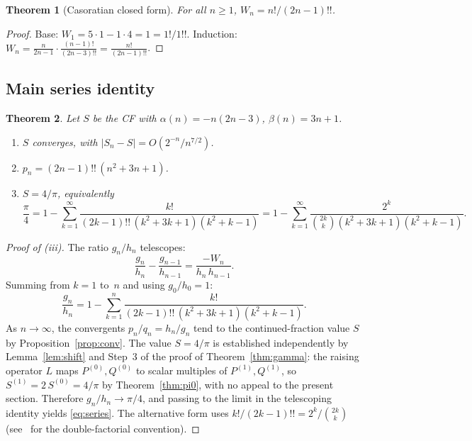\documentclass[11pt,a4paper]{article}
\theoremstyle{plain}
\newtheorem{theorem}{Theorem}[section]
\theoremstyle{definition}
\theoremstyle{remark}
\newcommand{\dff}[1]{(#1)!!}
\begin{document}
\begin{theorem}[Casoratian closed form]\label{thm:cas}
For all $n \geq 1$,
$W_n = n!/\dff{2n{-}1}$.
\end{theorem}

\begin{proof}
Base: $W_1 = 5\cdot 1 - 1\cdot 4 = 1 = 1!/1!!$.
Induction:
$W_n = \frac{n}{2n{-}1}\cdot\frac{(n{-}1)!}{\dff{2n{-}3}}
= \frac{n!}{\dff{2n{-}1}}$.
\end{proof}

\subsection{Main series identity}

\begin{theorem}\label{thm:4overpi}
Let $S$ be the CF with $\alpha(n) = -n(2n{-}3)$,
$\beta(n) = 3n{+}1$.
\begin{enumerate}
\item[\textup{(i)}]
  $S$ converges, with $|S_n - S| = O(2^{-n}/n^{7/2})$.
\item[\textup{(ii)}]
  $p_n = \dff{2n{-}1}\,(n^2{+}3n{+}1)$.
\item[\textup{(iii)}]
  $S = 4/\pi$, equivalently
\begin{equation}\label{eq:series}
  \frac{\pi}{4}
  = 1 - \sum_{k=1}^{\infty}
    \frac{k!}{\dff{2k{-}1}\,(k^2{+}3k{+}1)(k^2{+}k{-}1)}
  = 1 - \sum_{k=1}^{\infty}
    \frac{2^k}{\binom{2k}{k}(k^2{+}3k{+}1)(k^2{+}k{-}1)}.
\end{equation}
\end{enumerate}
\end{theorem}

\begin{proof}[Proof of \textup{(iii)}]
The ratio $g_n/h_n$ telescopes:
\[
  \frac{g_n}{h_n} - \frac{g_{n-1}}{h_{n-1}}
  = \frac{-W_n}{h_n\,h_{n-1}}.
\]
Summing from $k = 1$ to~$n$ and using $g_0/h_0 = 1$:
\[
  \frac{g_n}{h_n}
  = 1 - \sum_{k=1}^{n}
    \frac{k!}{\dff{2k{-}1}\,(k^2{+}3k{+}1)(k^2{+}k{-}1)}.
\]
As $n\to\infty$, the convergents $p_n/q_n = h_n/g_n$ tend to the
continued-fraction value $S$ by Proposition~\ref{prop:conv}.
The value $S = 4/\pi$ is established independently by
Lemma~\ref{lem:shift} and Step~3 of the proof of
Theorem~\ref{thm:gamma}: the raising operator $L$ maps
$P^{(0)},Q^{(0)}$ to scalar multiples of $P^{(1)},Q^{(1)}$, so
$S^{(1)} = 2\,S^{(0)} = 4/\pi$ by Theorem~\ref{thm:pi0}, with no
appeal to the present section. Therefore $g_n/h_n \to \pi/4$, and
passing to the limit in the telescoping identity yields
\eqref{eq:series}. The alternative form uses
$k!/\dff{2k{-}1} = 2^k/\binom{2k}{k}$
(see~\cite[\S1.2.6]{knuth1997} for the double-factorial convention).
\end{proof}
\end{document}
